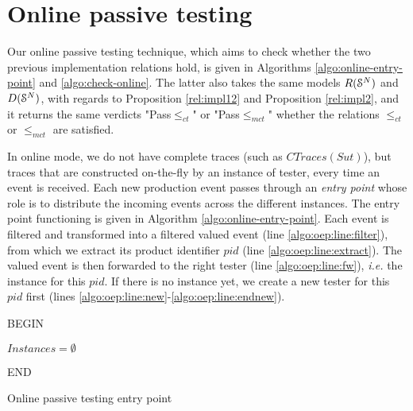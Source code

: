 \section{Online passive testing}
\label{sec:testing:online}

Our online passive testing technique, which aims to check whether
the two previous implementation relations hold, is given in
Algorithms \ref{algo:online-entry-point} and
\ref{algo:check-online}. The latter also takes the same models
$R(\EuScript{S}^{N})$ and $D(\EuScript{S}^{N})$, with regards to
Proposition \ref{rel:impl12} and Proposition \ref{rel:impl2}, and
it returns the same verdicts "Pass$\leq_{ct}$" or
"Pass$\leq_{mct}$" whether the relations $\leq_{ct}$ or
$\leq_{mct}$ are satisfied.

In online mode, we do not have complete traces (such as
$CTraces({Sut})$), but traces that are constructed on-the-fly by
an instance of tester, every time an event is received. Each new
production event passes through an \emph{entry point} whose role
is to distribute the incoming events across the different
instances. The entry point functioning is given in Algorithm
\ref{algo:online-entry-point}. Each event is filtered and
transformed into a filtered valued event (line
\ref{algo:oep:line:filter}), from which we extract its product
identifier $pid$ (line \ref{algo:oep:line:extract}).  The valued
event is then forwarded to the right tester (line
\ref{algo:oep:line:fw}), \emph{i.e.} the instance for this $pid$.
If there is no instance yet, we create a new tester for this
$pid$ first (lines
\ref{algo:oep:line:new}-\ref{algo:oep:line:endnew}).

\begin{algorithm}[h]
    BEGIN\;

    $Instances = \emptyset$\;


    END\;

    \caption{Online passive testing entry point}
    \label{algo:online-entry-point}
\end{algorithm}

